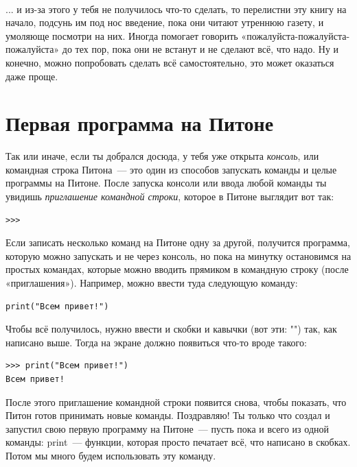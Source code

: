 \begin{samepage}
\nopagebreak
\paragraph*{}
... и из-за этого у тебя не получилось что-то сделать, то перелистни эту книгу на начало, подсунь им под нос введение, пока они читают утреннюю газету, и умоляюще посмотри на них. Иногда помогает говорить «пожалуйста-пожалуйста-пожалуйста» до тех пор, пока они не встанут и не сделают всё, что надо. Ну и конечно, можно попробовать сделать всё самостоятельно, это может оказаться даже проще.
\end{samepage}

\section{Первая программа на Питоне}

Так или иначе, если ты добрался досюда, у тебя уже открыта \emph{консоль}, или командная строка Питона — это один из способов запускать команды и целые программы на Питоне. После запуска консоли или ввода любой команды ты увидишь \emph{приглашение командной строки}, которое в Питоне выглядит вот так:

\begin{verbatim}
>>>
\end{verbatim}

Если записать несколько команд на Питоне одну за другой, получится программа, которую можно запускать и не через консоль, но пока на минутку остановимся на простых командах, которые можно вводить прямиком в командную строку (после «приглашения»). Например, можно ввести туда следующую команду:

\begin{verbatim}
print("Всем привет!")
\end{verbatim}

Чтобы всё получилось, нужно ввести и скобки и кавычки (вот эти: "") так, как написано выше. Тогда на экране должно появиться что-то вроде такого:

\begin{verbatim}
>>> print("Всем привет!")
Всем привет!
\end{verbatim}

После этого приглашение командной строки появится снова, чтобы показать, что Питон готов принимать новые команды. Поздравляю! Ты только что создал и запустил свою первую программу на Питоне — пусть пока и всего из одной команды: print — функции, которая просто печатает всё, что написано в скобках. Потом мы много будем использовать эту команду.

